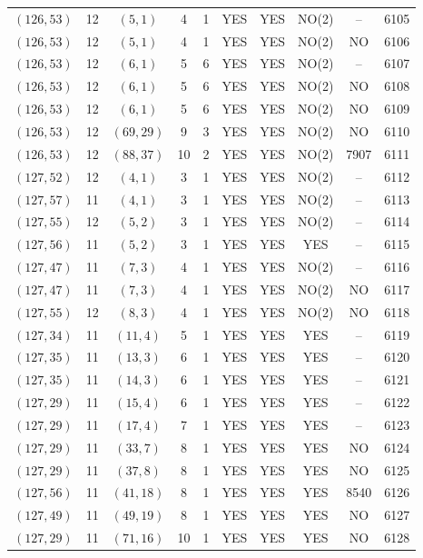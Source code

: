 \begin{longtable}{|c|c|c|c|c|c|c|c|c|c|}
$(126, 53)$ & 12 & $(5, 1)$ & 4 & 1 & YES & YES & NO(2) & -- & 6105\\
$(126, 53)$ & 12 & $(5, 1)$ & 4 & 1 & YES & YES & NO(2) & NO & 6106\\
$(126, 53)$ & 12 & $(6, 1)$ & 5 & 6 & YES & YES & NO(2) & -- & 6107\\
$(126, 53)$ & 12 & $(6, 1)$ & 5 & 6 & YES & YES & NO(2) & NO & 6108\\
$(126, 53)$ & 12 & $(6, 1)$ & 5 & 6 & YES & YES & NO(2) & NO & 6109\\
$(126, 53)$ & 12 & $(69, 29)$ & 9 & 3 & YES & YES & NO(2) & NO & 6110\\
$(126, 53)$ & 12 & $(88, 37)$ & 10 & 2 & YES & YES & NO(2) & 7907 & 6111\\
$(127, 52)$ & 12 & $(4, 1)$ & 3 & 1 & YES & YES & NO(2) & -- & 6112\\
$(127, 57)$ & 11 & $(4, 1)$ & 3 & 1 & YES & YES & NO(2) & -- & 6113\\
$(127, 55)$ & 12 & $(5, 2)$ & 3 & 1 & YES & YES & NO(2) & -- & 6114\\
$(127, 56)$ & 11 & $(5, 2)$ & 3 & 1 & YES & YES & YES & -- & 6115\\
$(127, 47)$ & 11 & $(7, 3)$ & 4 & 1 & YES & YES & NO(2) & -- & 6116\\
$(127, 47)$ & 11 & $(7, 3)$ & 4 & 1 & YES & YES & NO(2) & NO & 6117\\
$(127, 55)$ & 12 & $(8, 3)$ & 4 & 1 & YES & YES & NO(2) & NO & 6118\\
$(127, 34)$ & 11 & $(11, 4)$ & 5 & 1 & YES & YES & YES & -- & 6119\\
$(127, 35)$ & 11 & $(13, 3)$ & 6 & 1 & YES & YES & YES & -- & 6120\\
$(127, 35)$ & 11 & $(14, 3)$ & 6 & 1 & YES & YES & YES & -- & 6121\\
$(127, 29)$ & 11 & $(15, 4)$ & 6 & 1 & YES & YES & YES & -- & 6122\\
$(127, 29)$ & 11 & $(17, 4)$ & 7 & 1 & YES & YES & YES & -- & 6123\\
$(127, 29)$ & 11 & $(33, 7)$ & 8 & 1 & YES & YES & YES & NO & 6124\\
$(127, 29)$ & 11 & $(37, 8)$ & 8 & 1 & YES & YES & YES & NO & 6125\\
$(127, 56)$ & 11 & $(41, 18)$ & 8 & 1 & YES & YES & YES & 8540 & 6126\\
$(127, 49)$ & 11 & $(49, 19)$ & 8 & 1 & YES & YES & YES & NO & 6127\\
$(127, 29)$ & 11 & $(71, 16)$ & 10 & 1 & YES & YES & YES & NO & 6128\\

\end{longtable}
